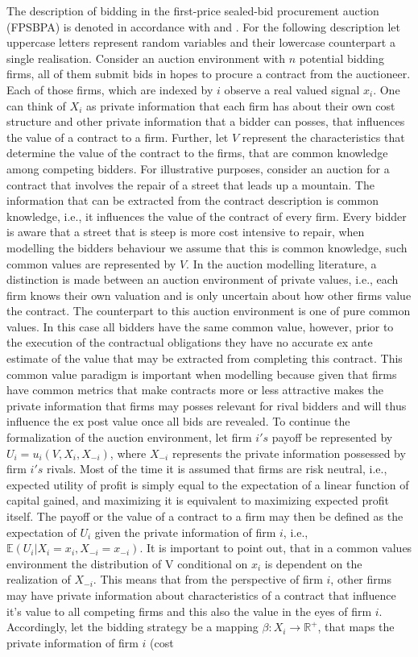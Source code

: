 \documentclass[a4paper,12pt, headsepline]{scrartcl}
\numberwithin{equation}{section}
\begin{document}
The description of bidding in the first-price sealed-bid procurement auction (FPSBPA) is denoted in accordance with \citet{milgrom82} and \citet{HandbookIndustrialOrga}. For the following description let uppercase letters represent random variables and their lowercase counterpart a single realisation. Consider an auction environment with $n$ potential bidding firms, all of them submit bids in hopes to procure a contract from the auctioneer. Each of those firms, which are indexed by $i$ observe a real valued signal $x_i$. One can think of $X_i$ as private information that each firm has about their own cost structure and other private information that a bidder can posses, that influences the value of a contract to a firm. Further, let $V$ represent the characteristics that determine the value of the contract to the firms, that are common knowledge among competing bidders. For illustrative purposes, consider an auction for a contract that involves the repair of a street that leads up a mountain. The information that can be extracted from the contract description is common knowledge, i.e., it influences the value of the contract of every firm. Every bidder is aware that a street that is steep is more cost intensive to repair, when modelling the bidders behaviour we assume that this is common knowledge, such common values are represented by $V$. In the auction modelling literature, a distinction is made between an auction environment of private values, i.e., each firm knows their own valuation and is only uncertain about how other firms value the contract. The counterpart to this auction environment is one of pure common values. In this case all bidders have the same common value, however, prior to the execution of the contractual obligations they have no accurate ex ante estimate of the value that may be extracted from completing this contract. This common value paradigm is important when modelling because given that firms have common metrics that make contracts more or less attractive makes the private information that firms may posses relevant for rival bidders and will thus influence the ex post value once all bids are revealed. To continue the formalization of the auction environment, let firm $i's$ payoff be represented by $U_i = u_i(V, X_i, X_{-i})$, where $X_{-i}$ represents the private information possessed by firm $i's$ rivals. Most of the time it is assumed that firms are risk neutral, i.e., expected utility of profit is simply equal to the expectation of a linear function of capital gained, and maximizing it is equivalent to maximizing expected profit itself. The payoff or the value of a contract to a firm may then be defined as the expectation of $U_i$ given the private information of firm $i$, i.e., $\mathbb{E}(U_i|X_i = x_i, X_{-i} = x_{-i})$. It is important to point out, that in a common values environment the distribution of V conditional on $x_{i}$ is dependent on the realization of $X_{-i}$. This means that from the perspective of firm $i$, other firms may have private information about characteristics of a contract that influence it's value to all competing firms and this also the value in the eyes of firm $i$. Accordingly, let the bidding strategy be a mapping $\beta: X_i \rightarrow \mathbb{R}^+$, that maps the private information of firm $i$ (cost 
\end{document}

